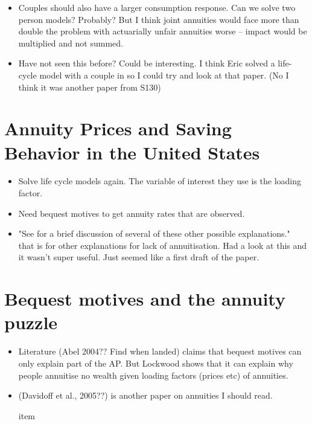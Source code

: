 \documentclass[12pt]{article}
\begin{document}
\begin{itemize}
    \item Couples should also have a larger consumption response. Can we solve
          two person models? Probably? But I think joint annuities would face
          more than double the problem with actuarially unfair annuities worse --
          impact would be multiplied and not summed.

    \item Have not seen this before? Could be interesting. I think Eric solved a life-cycle model
          with a couple in so I could try and look at that paper. (No I think it was another paper from S130)

\end{itemize}

\section{Annuity Prices and Saving Behavior in the United States}
\begin{itemize}
    \item Solve life cycle models again. The variable of interest they use is the
          loading factor.

    \item Need bequest motives to get annuity rates that are observed.
    \item "See \cite{friedman_warshawsky_nber_1985} for a brief discussion of several
          of these other possible explanations." that is for other explanations for
          lack of annuitisation. Had a look at this and it wasn't super useful. Just
          seemed like a first draft of the paper.



\end{itemize}


\section{Bequest motives and the annuity puzzle}
\begin{itemize}
    \item Literature (Abel 2004?? Find when landed) claims that bequest motives
          can only explain part of the AP. But Lockwood shows that it can explain why people
          annuitise no wealth given loading factors (prices etc) of annuities.

    \item  (Davidoff et al., 2005??) is another paper on annuities I should read.

          item
\end{itemize}
\end{document}
